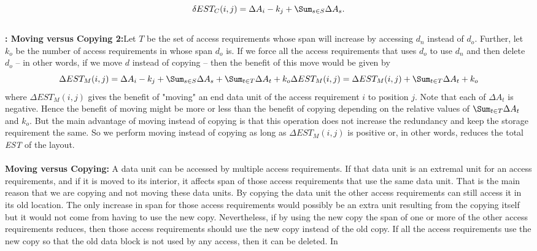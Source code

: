 \begin{equation}
 \delta EST_C(i,j) = \Delta A_i - k_j + \Sum_{s\in S}\Delta{A_s}.
\label{eq:copyingcost}
\end{equation}
\\
{\bf: Moving versus Copying 2:}Let $T$ be the set of access requirements whose span will increase by accessing $d_n$ instead of $d_o$. Further, let $k_o$ be the number of access requirements in whose span $d_o$ is. If we force all the access requirements that uses $d_o$ to use $d_n$ and then delete $d_o$ -- in other words, if we move $d$ instead of copying -- then the benefit of this move would be given by
\begin{equation}
 \Delta EST_M(i,j) = \Delta A_i - k_j + \Sum_{s\in S}\Delta{A_s} + \Sum_{t\in T}\Delta{A_t} + k_o \\
 \Delta EST_M(i,j) = \Delta EST_M(i,j) + \Sum_{t\in T}\Delta{A_t} + k_o \\
\label{eq:movingcost}
\end{equation}
where $\Delta EST_M(i,j)$ gives the benefit of "moving" an end data unit of the access requirement $i$ to position $j$. Note that each of $\Delta{A_t}$ is negative. Hence the benefit of moving might be more or less than the benefit of copying depending on the relative values of $\Sum_{t\in T}\Delta{A_t}$ and $k_o$. But the main advantage of moving instead of copying is that this operation does not increase the redundancy and keep the storage requirement the same. So we perform moving instead of copying as long as $\Delta EST_M(i,j)$ is positive or, in other words, reduces the total {\em EST} of the layout.\\
\\
{\bf Moving versus Copying:} A data unit can be accessed by multiple access
requirements. If that data unit is an extremal unit for an access
requirements, and if it is moved to its interior, it affects span of those access
requirements that use the
same data unit. That is the main reason that we are copying and not moving
these data units. 
By copying the data unit the other access requirements can
still access it in its old location. The only increase in span for those access requirements would possibly be an extra unit resulting from the copying itself but it would not come from having to use the new copy.
Nevertheless, if by using the new copy the span of one or more of the other
access requirements reduces, then those access requirements should use the new
copy instead of the old copy. If all the access requirements use the new copy
so that the old data block is not used by any access, then it can be deleted. In
